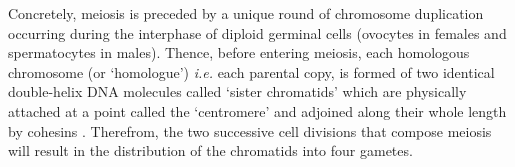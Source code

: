 




Concretely, meiosis is preceded by a unique round of chromosome duplication occurring during the interphase of diploid germinal cells (ovocytes in females and spermatocytes in males).
Thence, before entering meiosis, each homologous chromosome (or ‘homologue’) \textit{i.e.} each parental copy, is formed of two identical double-helix DNA molecules called ‘sister chromatids’ which are physically attached at a point called the ‘centromere’ and adjoined along their whole length by cohesins \citep{klein1999central}.
Therefrom, the two successive cell divisions that compose meiosis will result in the distribution of the chromatids into four gametes.

